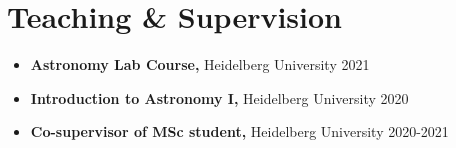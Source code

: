 \section*{Teaching \& Supervision}

\begin{itemize}
    \item \textbf{Astronomy Lab Course,} Heidelberg University \hfill 2021
    \item \textbf{Introduction to Astronomy I,} Heidelberg University \hfill 2020
    \item \textbf{Co-supervisor of MSc student,} Heidelberg University \hfill 2020-2021
\end{itemize}